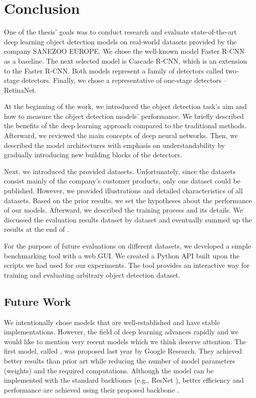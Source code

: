 \chapter{Conclusion}\label{chap:conclusion}

One of the thesis' goals was to conduct research and evaluate state-of-the-art
deep learning object detection models on real-world datasets provided by the
company SANEZOO EUROPE. We chose the well-known model Faster R-CNN as a
baseline. The next selected model is Cascade R-CNN, which is an extension to the
Faster R-CNN. Both models represent a family of detectors called two-stage
detectors. Finally, we chose a representative of one-stage detectors --
RetinaNet.

At the beginning of the work, we introduced the object detection task's aim and
how to measure the object detection models' performance. We briefly described
the benefits of the deep learning approach compared to the traditional methods.
Afterward, we reviewed the main concepts of deep neural networks. Then, we
described the model architectures with emphasis on understandability by
gradually introducing new building blocks of the detectors.

Next, we introduced the provided datasets. Unfortunately, since the
datasets consist mainly of the company's customer products, only one dataset
could be published. However, we provided illustrations and detailed
characteristics of all datasets. Based on the prior results, we set the hypotheses about
the performance of our models. Afterward, we described the training
process and its details. We discussed the evaluation results dataset by
dataset and eventually summed up the results at the end of .

For the purpose of future evaluations on different datasets, we developed
a simple benchmarking tool with a web GUI. We created a Python API built
upon the scripts we had used for our experiments. The tool provides an
interactive way for training and evaluating arbitrary object detection dataset.

\section{Future Work}
We intentionally chose models that are well-established and have stable
implementations. However, the field of deep learning advances rapidly and we
would like to mention very recent models which we think deserve attention. The
first model, called  \cite{efficientdet}, was proposed last year by
Google Research. They achieved better results than prior art while reducing the
number of model parameters (weights) and the required computations. Although the
model can be implemented with the standard backbones (e.g., ResNet
\cite{resnet}), better efficiency and performance are achieved using their
proposed backbone  \cite{efficientnet}.

